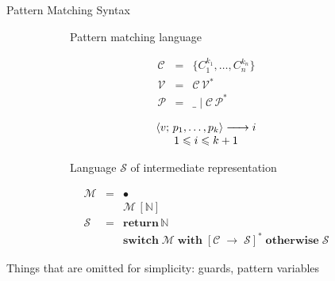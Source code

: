 \documentclass[aspectratio=169
  , xcolor={svgnames}
  , hyperref={ colorlinks,citecolor=Blue
             , linkcolor=DarkRed,urlcolor=DarkBlue}
  , russian
  ]{beamer}
\def\transarrow{\xrightarrow}
\def\padding{\phantom{X}}
\def\subarrow{}
\newcommand{\trans}[3]{{#1}\transarrow{\padding{\textstyle #2}\padding}\subarrow{#3}}
\newcommand{\inbr}[1]{\left<{#1}\right>}
\newcommand{\primi}[1]{\mathbf{#1}}
\newcommand{\ir}{\ensuremath{\mathcal{S}}}
\begin{document}
\begin{frame}[fragile]{Pattern Matching Syntax}
\begin{figure}[ht]
\begin{subfigure}[t]{0.4\linewidth}
\begin{center}
Pattern matching language
\end{center}
\[
 \begin{array}{rcll}
    \mathcal{C} & = & \{ C_1^{k_1}, \dots, C_n^{k_n} \}\\
    \mathcal{V} & = & \mathcal{C}\,\mathcal{V}^*\\  
    \mathcal{P} & = & \_ \mid \mathcal{C}\,\mathcal{P}^*
 \end{array}
\]
\[
 \begin{array}{c}
\trans{\inbr{v;\,p_1,\dots,p_k}}{}{i}\\
1\leqslant i\leqslant k+1
 \end{array}
\]
\end{subfigure}
\hspace{0.5cm}
\begin{subfigure}[t]{0.5\linewidth}
\begin{center}
Language \ir{} of intermediate representation
\end{center}
\[
\begin{array}{rcl}
  \mathcal M & = & \bullet \\
  &   & \mathcal M\,[\mathbb{N}] \\
  \ir & = & \primi{return}\,\mathbb{N} \\
  &   & \primi{switch}\;\mathcal{M}\;\primi{with}\; [\mathcal{C}\; \primi{\rightarrow}\; \ir]^*\;\primi{otherwise}\;\ir
\end{array}
\]
\end{subfigure}
\end{figure}
\vspace{0.5cm}
Things that are omitted for simplicity: guards, pattern variables

\end{frame}
\end{document}
